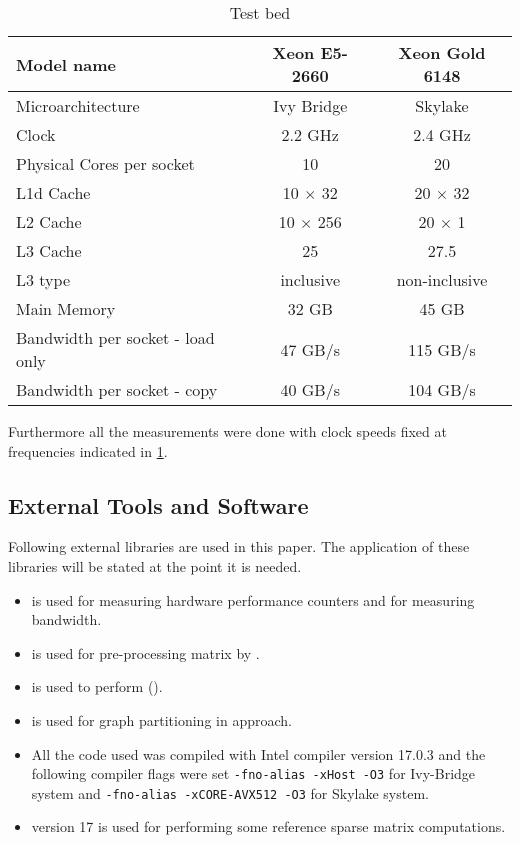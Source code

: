 \begin{table}[tbhp]
	\footnotesize
	\caption{Test bed}\label{tab:test_bed}
	\begin{center}
		\begin{tabular}{|l| c  c |}
			\toprule
			{Model name} & {Xeon\textsuperscript{\textregistered} E5-2660} & {Xeon\textsuperscript{\textregistered} Gold 6148} \\
			\midrule
			{Microarchitecture} & {Ivy Bridge} & {Skylake} \\
			\midrule
			{Clock} & {2.2 GHz} & {2.4 GHz}\\
			{Physical Cores per socket} & {10} & {20} \\
			{L1d Cache} & {10 $\times$ 32 \KB} & {20 $\times$ 32 \KB}\\
			{L2 Cache} & {10 $\times$ 256 \KB} & {20 $\times$ 1 \MB} \\
			{L3 Cache} & {25 \MB} & {27.5 \MB}\\
			{L3 type} & {inclusive} & {non-inclusive}\\
			{Main Memory} & {32 GB} & {45 GB}\\
			{Bandwidth per socket - load only} & {47 GB/s} & {115 GB/s}\\ %
			{Bandwidth per socket - copy} & {40 GB/s} & {104 GB/s}\\
			\bottomrule
		\end{tabular}
	\end{center}
\end{table} 

Furthermore all the measurements were done with  \CPU clock speeds fixed at frequencies indicated in \cref{tab:test_bed}.


\subsection{External Tools and Software}
Following external libraries are used in this paper. The application of these libraries will be stated at the point it is needed.
\begin{itemize}
	\item \LIKWID \cite{LIKWID}  is used for measuring hardware performance counters and   for measuring bandwidth.
	\item \COLPACK \cite{COLPACK} is used for pre-processing matrix by \MCfull.
	\item \SPMP \cite{SpMP} is used to perform \RCMfull (\RCM).
	\item \METIS\cite{METIS} is used for graph partitioning in \ABMC approach.
	\item All the code used was compiled with Intel compiler version 17.0.3 and the following compiler flags were set {\tt -fno-alias -xHost -O3} for Ivy-Bridge system and {\tt -fno-alias -xCORE-AVX512 -O3} for Skylake system.
	\item \MKL \cite{MKL} version 17 is used for performing some reference sparse matrix computations.
\end{itemize}

